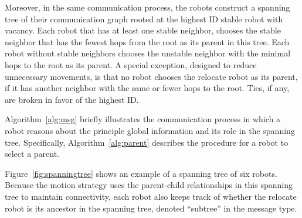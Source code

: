 Moreover, in the same communication process, the robots construct a spanning
tree of their communication graph rooted at the highest ID stable robot with
vacancy.  
%
Each robot that has at least one stable neighbor, chooses the stable neighbor that has the fewest hops from the root as its parent in this tree.
%
Each robot without stable neighbors chooses the unstable neighbor with the minimal hops to the root as its parent.  
%
A special exception, designed to reduce unnecessary movements, is that no robot chooses the relocate robot as its parent, if it has another neighbor with the same or fewer hops to the root.  
%
Ties, if any, are broken in favor of the highest ID.  


Algorithm~\ref{alg:msg} briefly illustrates the communication process in which a robot reasons about the principle global information and its role in the spanning tree.
%
Specifically, Algorithm~\ref{alg:parent} describes the procedure for a robot to select a parent. 


Figure~\ref{fig:spanningtree} shows an example of a spanning tree of six robots.
%
Because the motion strategy uses the parent-child relationships in this
spanning tree to maintain connectivity, each robot also keeps track of whether
the relocate robot is its ancestor in the spanning tree, denoted ``subtree'' in
the message type.


